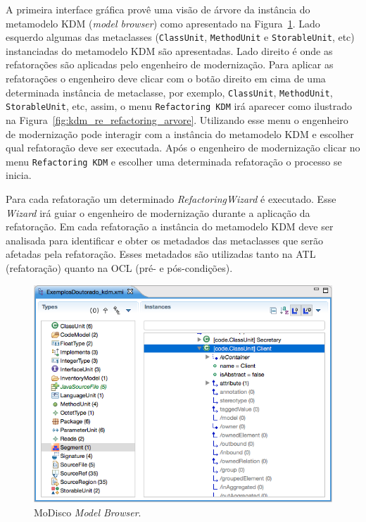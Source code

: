 A primeira interface gráfica provê uma visão de árvore da instância do metamodelo KDM (\textit{model browser}) como apresentado na Figura~\ref{fig:modisco_modeol_browser}. Lado esquerdo algumas das metaclasses (\texttt{ClassUnit}, \texttt{MethodUnit} e \texttt{StorableUnit}, etc) instanciadas do metamodelo KDM são apresentadas. Lado direito é onde as refatorações são aplicadas pelo engenheiro de modernização. Para aplicar as refatorações o engenheiro deve clicar com o botão direito em cima de uma determinada instância de metaclasse, por exemplo, \texttt{ClassUnit}, \texttt{MethodUnit}, \texttt{StorableUnit}, etc, assim, o menu \texttt{Refactoring KDM} irá aparecer como ilustrado na Figura~\ref{fig:kdm_re_refactoring_arvore}. Utilizando esse menu o engenheiro de modernização pode interagir com a instância do metamodelo KDM e escolher qual refatoração deve ser executada. Após o engenheiro de modernização clicar no menu \texttt{Refactoring KDM} e escolher uma determinada refatoração o processo se inicia. 

Para cada refatoração um determinado \textit{RefactoringWizard} é executado. Esse \textit{Wizard} irá guiar o engenheiro de modernização durante a aplicação da refatoração. Em cada refatoração a instância do metamodelo KDM deve ser analisada para identificar e obter os metadados das metaclasses que serão afetadas pela refatoração. Esses metadados são utilizadas tanto na ATL (refatoração) quanto na OCL (pré- e pós-condições). 


\begin{figure}[h]
	\centering
	\caption{MoDisco \textit{Model Browser}.}
	\label{fig:modisco_modeol_browser}
	\includegraphics[scale=0.6]{images/kdm-re_modisco}
	\fautor
\end{figure}

